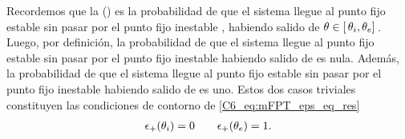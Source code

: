 \documentclass[./main.tex]{subfiles}
\begin{document}
Recordemos que la \epsplus(\xx) es la probabilidad de que el sistema llegue al punto fijo estable \xxe sin pasar por el punto fijo inestable \xxi, habiendo salido de $ \theta  \in [ \,\theta_i,\theta_e ]\,$. Luego, por definición, la probabilidad de que el sistema llegue al punto fijo estable \xxe sin pasar por el punto fijo inestable \xxi habiendo salido de \xxi es nula. Además, la probabilidad de que el sistema llegue al punto fijo estable \xxe sin pasar por el punto fijo inestable \xxi habiendo salido de \xxe es uno. Estos dos casos triviales constituyen las condiciones de contorno de \ref{C6_eq:mFPT_eps_eq_res}
\begin{align}
    \epsilon_{+}(\theta_i) = 0 \qquad \epsilon_{+}(\theta_e) = 1.
    \label{C6_eq:mFPT_eps_cdc}
\end{align}
\end{document}
